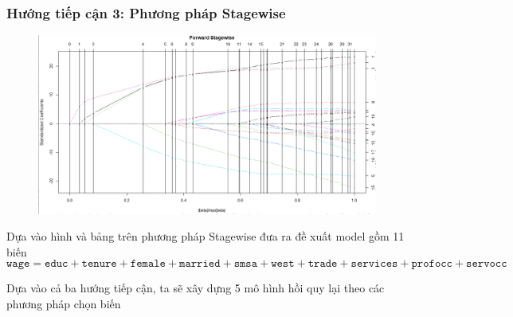 \subsubsection*{Hướng tiếp cận 3: Phương pháp Stagewise}
\begin{figure}[H]
	\centering
	\includegraphics[width=.85\linewidth]{../Photo Of Result/stagewise plot}
\end{figure}

Dựa vào hình và bảng trên phương pháp Stagewise đưa ra đề xuất model gồm 11 biến
\[\texttt{wage} = \texttt{educ} + \texttt{tenure} + \texttt{female} + \texttt{married} + \texttt{smsa} + \texttt{west} + \texttt{trade} + \texttt{services} + \texttt{profocc} + \texttt{servocc} \]

Dựa vào cả ba hướng tiếp cận, ta sẽ xây dựng 5 mô hình hồi quy lại theo các phương pháp chọn biến

